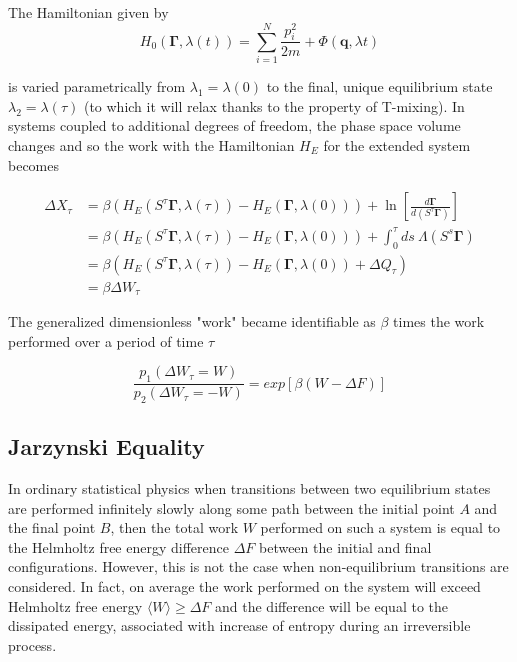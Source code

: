 \documentclass[a4paper,12pt]{article}
\begin{document}
The Hamiltonian given by
\begin{equation}
  H_0(\bm{\Gamma},\lambda(t)) = \sum_{i=1}^N \frac{p_i^2}{2m} + \Phi(\bm{q}, \lambda{t})
\end{equation}

is varied parametrically from $\lambda_1 =\lambda(0)$ to the final, unique equilibrium state $\lambda_2 = \lambda(\tau)$ (to which it will relax thanks to the property of T-mixing). In systems coupled to additional degrees of freedom, the phase space volume changes and so the work with the Hamiltonian $H_E$ for the extended system becomes

\begin{equation}
\begin{aligned}
  \Delta X_\tau &= \beta ( H_E(S^\tau \bm{\Gamma}, \lambda(\tau))-H_E(\bm{\Gamma},\lambda(0))) + \ln\left[\frac{d\bm{\Gamma}}{d(S^\tau \bm{\Gamma})}\right]\\
  &=\beta ( H_E(S^\tau \bm{\Gamma}, \lambda(\tau))-H_E(\bm{\Gamma},\lambda(0))) + \int_0^\tau ds\ \Lambda(S^s\bm{\Gamma})\\
  &=\beta ( H_E(S^\tau \bm{\Gamma}, \lambda(\tau))-H_E(\bm{\Gamma},\lambda(0)) +\Delta Q_\tau) \\
  &=\beta \Delta W_\tau
\end{aligned}
\end{equation}

The generalized dimensionless "work" became identifiable as $\beta$ times the work performed over a period of time $\tau$

\begin{equation}
\label{CFT}
  \frac{p_1(\Delta W_\tau =W)}{p_2(\Delta W_\tau = -W)} = exp[\beta (W - \Delta F)]
\end{equation}


\subsection{Jarzynski Equality}

In ordinary statistical physics when transitions between two equilibrium states are performed infinitely slowly along some path between the initial point $A$ and the final point $B$, then the total work $W$ performed on such a system is equal to the Helmholtz free energy difference $\Delta F$ between the initial and final configurations. However, this is not the case when non-equilibrium transitions are considered. In fact, on average the work performed on the system will exceed Helmholtz free energy $ \langle  W \rangle \geq \Delta F $ and the difference will be equal to the dissipated energy, associated with increase of entropy during an irreversible process.
\end{document}

